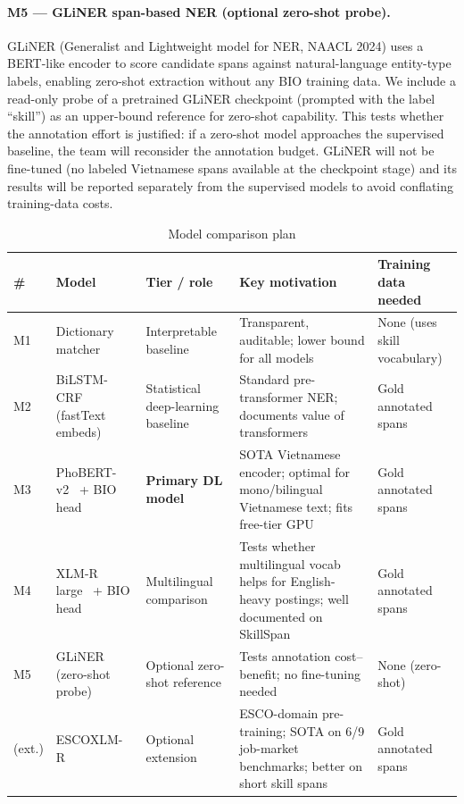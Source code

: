\documentclass[12pt,a4paper]{article}
\begin{document}
\paragraph{M5 — GLiNER span-based NER (optional zero-shot probe).}
GLiNER (Generalist and Lightweight model for NER, NAACL 2024)
\cite{gliner} uses a BERT-like encoder to score candidate spans against
natural-language entity-type labels, enabling zero-shot extraction without
any BIO training data. We include a read-only probe of a pretrained
GLiNER checkpoint (prompted with the label ``skill'') as an upper-bound
reference for zero-shot capability. This tests whether the annotation
effort is justified: if a zero-shot model approaches the supervised
baseline, the team will reconsider the annotation budget. GLiNER will not
be fine-tuned (no labeled Vietnamese spans available at the checkpoint
stage) and its results will be reported separately from the supervised
models to avoid conflating training-data costs.

\vspace{4pt}
{\hfuzz=16pt
\begin{table}[H]
\centering\small
\caption{Model comparison plan}
\label{tab:models}
\begin{tabularx}{\textwidth}{@{}P{0.4cm}P{3.0cm}P{2.3cm}LL@{}}
\toprule
\textbf{\#} & \textbf{Model} & \textbf{Tier / role} &
  \textbf{Key motivation} & \textbf{Training data needed} \\
\midrule
M1 & Dictionary matcher &
  Interpretable baseline &
  Transparent, auditable; lower bound for all models &
  None (uses skill vocabulary) \\
\addlinespace
M2 & BiLSTM-CRF (fastText embeds) &
  Statistical deep-learning baseline &
  Standard pre-transformer NER; documents value of transformers &
  Gold annotated spans \\
\addlinespace
M3 & PhoBERT-v2~\cite{phobert} + BIO head &
  \textbf{Primary DL model} &
  SOTA Vietnamese encoder; optimal for mono/bilingual Vietnamese text;
  fits free-tier GPU &
  Gold annotated spans \\
\addlinespace
M4 & XLM-R large~\cite{xlmr} + BIO head &
  Multilingual comparison &
  Tests whether multilingual vocab helps for English-heavy postings; well
  documented on SkillSpan~\cite{skillspan} &
  Gold annotated spans \\
\addlinespace
M5 & GLiNER~\cite{gliner} (zero-shot probe) &
  Optional zero-shot reference &
  Tests annotation cost--benefit; no fine-tuning needed &
  None (zero-shot) \\
\addlinespace
(ext.) & ESCOXLM-R~\cite{escoxlmr} &
  Optional extension &
  ESCO-domain pre-training; SOTA on 6/9 job-market benchmarks; better on
  short skill spans &
  Gold annotated spans \\
\bottomrule
\end{tabularx}
\end{table}
}
\end{document}
